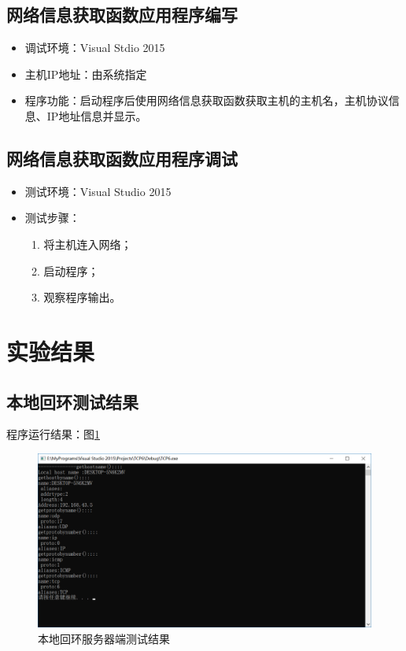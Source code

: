 \documentclass[a4paper]{ctexrep}
\begin{document}
\begin{spacing}{1.5}
\subsection{网络信息获取函数应用程序编写}
\begin{itemize}
	\item 调试环境：Visual Stdio 2015
	\item 主机IP地址：由系统指定
	\item 程序功能：启动程序后使用网络信息获取函数获取主机的主机名，主机协议信息、IP地址信息并显示。
\end{itemize}

\subsection{网络信息获取函数应用程序调试}
\begin{itemize}
	\item 测试环境：Visual Studio 2015
	\item 测试步骤：
	\begin{enumerate}
		\item 将主机连入网络；
		\item 启动程序；
		\item 观察程序输出。
	\end{enumerate}
\end{itemize}

\section{实验结果}
\subsection{本地回环测试结果}
程序运行结果：图\ref{result}
\begin{figure}[htbp]
	\centering
	\includegraphics [width=1\textwidth]{figure//result.png}
	\caption{本地回环服务器端测试结果}\label{result}
\end{figure}

\end{spacing}
\end{document}
